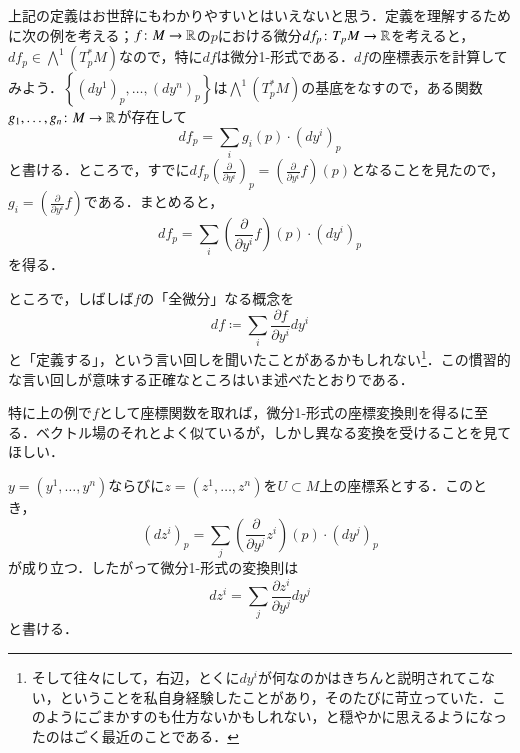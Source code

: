 \begin{exm}
上記の定義はお世辞にもわかりやすいとはいえないと思う．定義を理解するために次の例を考える；$f \colon M \to \mathbb{R}$の$p$における微分$df_p \colon T_pM \to \mathbb{R}$を考えると，$df_p \in \bigwedge^1(T^*_pM)$なので，特に$df$は微分1-形式である．$df$の座標表示を計算してみよう．$\left\{ (dy^1)_p,\dots, \left(dy^n\right)_p \right\}$は$\bigwedge^1 (T^*_pM)$の基底をなすので，ある関数$g_1, \dots, g_n \colon M \to \mathbb{R}$が存在して
\begin{equation}
df_p = \sum_i g_i(p) \cdot \left(dy^i \right)_p
\end{equation}と書ける．ところで，すでに$df_p \left( \frac{\partial}{\partial y^i} \right)_p = \left( \frac{\partial}{\partial y^i} f \right) (p)$となることを見たので，$g_i = \left( \frac{\partial}{\partial y^i} f \right)$である．まとめると，
\begin{equation}
df_p = \sum_i \left( \frac{\partial}{\partial y^i} f \right)(p) \cdot \left(dy^i \right)_p
\end{equation}を得る．

ところで，しばしば$f$の「全微分」なる概念を
\begin{equation}
df \coloneqq \sum_i  \frac{\partial f}{\partial y^i}  dy^i
\end{equation}と「定義する」，という言い回しを聞いたことがあるかもしれない\footnote{そして往々にして，右辺，とくに$dy^i$が何なのかはきちんと説明されてこない，ということを私自身経験したことがあり，そのたびに苛立っていた．このようにごまかすのも仕方ないかもしれない，と穏やかに思えるようになったのはごく最近のことである．}．この慣習的な言い回しが意味する正確なところはいま述べたとおりである．
\end{exm}

特に上の例で$f$として座標関数を取れば，微分1-形式の座標変換則を得るに至る．ベクトル場のそれとよく似ているが，しかし異なる変換を受けることを見てほしい．

\begin{prop}
$y=(y^1, \dots, y^n)$ならびに$z = (z^1,\dots, z^n)$を$U \subset M$上の座標系とする．このとき，
\begin{equation}
\left(dz^i\right)_p = \sum_{j} \left( \frac{\partial }{\partial y^j} z^i \right) (p) \cdot \left( dy^j \right)_p
\end{equation}が成り立つ．したがって微分1-形式の変換則は
\begin{equation}
dz^i = \sum_{j} \frac{\partial z^i}{\partial y^j} dy^j
\end{equation}と書ける．
\end{prop}

